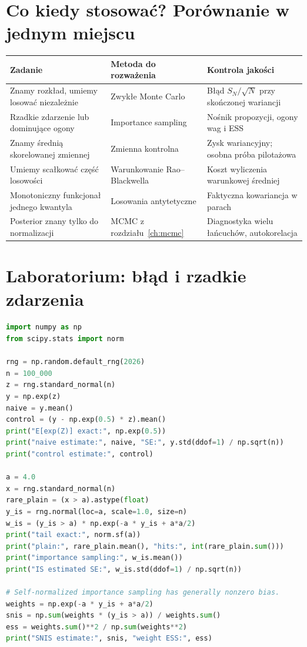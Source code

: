 \section{Co kiedy stosować? Porównanie w jednym miejscu}
\begin{center}\small
\begin{tabular}{>{\raggedright\arraybackslash}p{}>{\raggedright\arraybackslash}p{}>{\raggedright\arraybackslash}p{}}
\toprule
\textbf{Zadanie} & \textbf{Metoda do rozważenia} & \textbf{Kontrola jakości}\\
\midrule
Znamy rozkład, umiemy losować niezależnie & Zwykłe Monte Carlo & Błąd $S_N/\sqrt N$ przy skończonej wariancji\\
Rzadkie zdarzenie lub dominujące ogony & Importance sampling & Nośnik propozycji, ogony wag i ESS\\
Znamy średnią skorelowanej zmiennej & Zmienna kontrolna & Zysk wariancyjny; osobna próba pilotażowa\\
Umiemy scałkować część losowości & Warunkowanie Rao--Blackwella & Koszt wyliczenia warunkowej średniej\\
Monotoniczny funkcjonał jednego kwantyla & Losowania antytetyczne & Faktyczna kowariancja w parach\\
Posterior znany tylko do normalizacji & MCMC z rozdziału~\ref{ch:mcmc} & Diagnostyka wielu łańcuchów, autokorelacja\\
\bottomrule
\end{tabular}
\end{center}

\section{Laboratorium: błąd i rzadkie zdarzenia}
\begin{lstlisting}[language=Python,caption={Kompletny program: Monte Carlo, zmienna kontrolna i importance sampling dla ogona normalnego (Python, NumPy i SciPy).}]
import numpy as np
from scipy.stats import norm

rng = np.random.default_rng(2026)
n = 100_000
z = rng.standard_normal(n)
y = np.exp(z)
naive = y.mean()
control = (y - np.exp(0.5) * z).mean()
print("E[exp(Z)] exact:", np.exp(0.5))
print("naive estimate:", naive, "SE:", y.std(ddof=1) / np.sqrt(n))
print("control estimate:", control)

a = 4.0
x = rng.standard_normal(n)
rare_plain = (x > a).astype(float)
y_is = rng.normal(loc=a, scale=1.0, size=n)
w_is = (y_is > a) * np.exp(-a * y_is + a*a/2)
print("tail exact:", norm.sf(a))
print("plain:", rare_plain.mean(), "hits:", int(rare_plain.sum()))
print("importance sampling:", w_is.mean())
print("IS estimated SE:", w_is.std(ddof=1) / np.sqrt(n))

# Self-normalized importance sampling has generally nonzero bias.
weights = np.exp(-a * y_is + a*a/2)
snis = np.sum(weights * (y_is > a)) / weights.sum()
ess = weights.sum()**2 / np.sum(weights**2)
print("SNIS estimate:", snis, "weight ESS:", ess)
\end{lstlisting}

